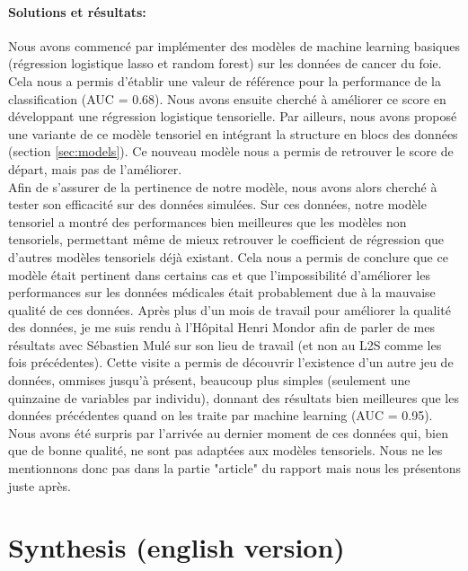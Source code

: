 \documentclass[preprint,12pt]{elsarticle}
\begin{document}
\paragraph*{Solutions et résultats:} Nous avons commencé par implémenter des modèles de machine learning basiques (régression logistique lasso et random forest) sur les données de cancer du foie. Cela nous a permis d'établir une valeur de référence pour la performance de la classification (AUC = 0.68). Nous avons ensuite cherché à améliorer ce score en développant une régression logistique tensorielle. Par ailleurs, nous avons proposé une variante de ce modèle tensoriel en intégrant la structure en blocs des données (section \ref{sec:models}). Ce nouveau modèle nous a permis de retrouver le score de départ, mais pas de l'améliorer.\\
\indent Afin de s'assurer de la pertinence de notre modèle, nous avons alors cherché à tester son efficacité sur des données simulées. Sur ces données, notre modèle tensoriel a montré des performances bien meilleures que les modèles non tensoriels, permettant même de mieux retrouver le coefficient de régression que d'autres modèles tensoriels déjà existant. Cela nous a permis de conclure que ce modèle était pertinent dans certains cas et que l'impossibilité d'améliorer les performances sur les données médicales était probablement due à la mauvaise qualité de ces données. Après plus d'un mois de travail pour améliorer la qualité des données, je me suis rendu à l'Hôpital Henri Mondor afin de parler de mes résultats avec Sébastien Mulé sur son lieu de travail (et non au L2S comme les fois précédentes). Cette visite a permis de découvrir l'existence d'un autre jeu de données, ommises jusqu'à présent, beaucoup plus simples (seulement une quinzaine de variables par individu), donnant des résultats bien meilleures que les données précédentes quand on les traite par machine learning (AUC = 0.95). Nous avons été surpris par l'arrivée au dernier moment de ces données qui, bien que de bonne qualité, ne sont pas adaptées aux modèles tensoriels. Nous ne les mentionnons donc pas dans la partie "article" du rapport mais nous les présentons juste après.\\

\newpage
\section*{Synthesis (english version)}
\vspace*{10 pt}
\end{document}
